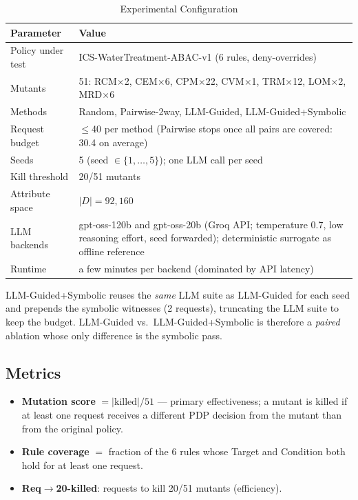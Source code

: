 \documentclass[conference]{IEEEtran}
\begin{document}
\begin{table}[htbp]
\caption{Experimental Configuration}
\label{tab:setup}
\begin{center}
\begin{tabular}{|p{2.8cm}|p{4.4cm}|}
\hline
\textbf{Parameter} & \textbf{Value} \\
\hline
Policy under test & ICS-WaterTreatment-ABAC-v1 (6 rules, deny-overrides) \\
\hline
Mutants & 51: RCM$\times$2, CEM$\times$6, CPM$\times$22, CVM$\times$1, TRM$\times$12, LOM$\times$2, MRD$\times$6 \\
\hline
Methods & Random, Pairwise-2way, LLM-Guided, LLM-Guided+Symbolic \\
\hline
Request budget & $\leq$40 per method (Pairwise stops once all pairs are covered: 30.4 on average) \\
\hline
Seeds & 5 (seed $\in \{1,\ldots,5\}$); one LLM call per seed \\
\hline
Kill threshold & 20/51 mutants \\
\hline
Attribute space & $|D|=92{,}160$ \\
\hline
LLM backends & gpt-oss-120b and gpt-oss-20b (Groq API; temperature 0.7, low reasoning effort, seed forwarded); deterministic surrogate as offline reference \\
\hline
Runtime & a few minutes per backend (dominated by API latency) \\
\hline
\end{tabular}
\end{center}
\end{table}

LLM-Guided+Symbolic reuses the \textit{same} LLM suite as LLM-Guided for each
seed and prepends the symbolic witnesses (2 requests), truncating the LLM
suite to keep the budget. LLM-Guided vs.\ LLM-Guided+Symbolic is therefore a
\textit{paired} ablation whose only difference is the symbolic pass.

\subsection{Metrics}

\begin{itemize}
  \item \textbf{Mutation score} $= |\text{killed}|/51$ --- primary effectiveness;
    a mutant is killed if at least one request receives a different PDP decision
    from the mutant than from the original policy.
  \item \textbf{Rule coverage} $=$ fraction of the 6 rules whose Target and
    Condition both hold for at least one request.
  \item \textbf{Req$\to$20-killed}: requests to kill 20/51 mutants (efficiency).
\end{itemize}
\end{document}

